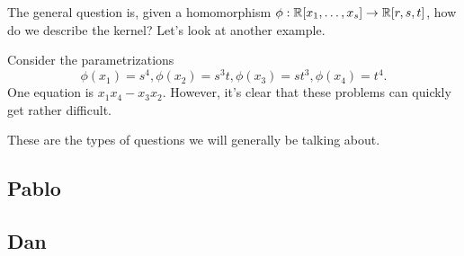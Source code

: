 \documentclass{../mathnotes}
\begin{document}
The general question is, given a homomorphism $\phi:\mathbb{R}[x_1,\ldots,x_s]\to\mathbb{R}[r,s,t]$, how do we describe the kernel?
Let's look at another example.

\begin{exmp}
    Consider the parametrizations
    \[\phi(x_1)=s^4,\phi(x_2)=s^3t,\phi(x_3)=st^3,\phi(x_4)=t^4.\]
    One equation is $x_1x_4-x_3x_2$. However, it's clear that these problems can quickly get rather difficult.
\end{exmp}

These are the types of questions we will generally be talking about.

\subsection{Pablo}

\subsection{Dan}
\end{document}
